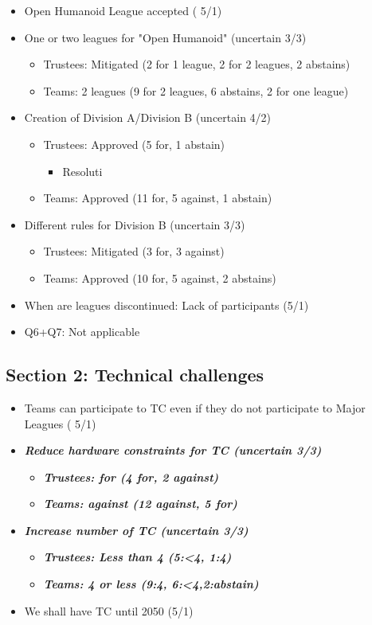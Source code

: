 \documentclass{article}
\begin{document}
\begin{itemize} 
   \item Open Humanoid League accepted ( 5/1)
   \item One or two leagues for "Open Humanoid" (uncertain 3/3)
   \begin{itemize} 
       \item Trustees: Mitigated (2 for 1 league, 2 for 2 leagues, 2 abstains)
       \item Teams: 2 leagues (9 for 2 leagues, 6 abstains, 2 for one league)
\end{itemize}
   \item Creation of Division A/Division B (uncertain 4/2)
   \begin{itemize} 
       \item Trustees: Approved (5 for, 1 abstain)
           \begin{itemize} 
               \item Resoluti
   \end{itemize}
       \item Teams: Approved (11 for, 5 against, 1 abstain)
\end{itemize}
   \item Different rules for Division B (uncertain 3/3)
   \begin{itemize} 
       \item Trustees: Mitigated (3 for, 3 against)
       \item Teams: Approved (10 for, 5 against, 2 abstains)
\end{itemize}
   \item When are leagues discontinued: Lack of participants (5/1)
   \item Q6+Q7: Not applicable
\end{itemize}
\subsection{Section 2: Technical challenges}

\begin{itemize} 
   \item Teams can participate to TC even if they do not participate to Major Leagues ( 5/1)
   \item \textbf{\textit{Reduce hardware constraints for TC (uncertain 3/3)}}
   \begin{itemize} 
       \item \textbf{\textit{Trustees: for (4 for, 2 against)}}
       \item \textbf{\textit{Teams: against (12 against, 5 for)}}
\end{itemize}
   \item \textbf{\textit{Increase number of TC (uncertain 3/3)}}
   \begin{itemize} 
       \item \textbf{\textit{Trustees: Less than 4 (5:<4, 1:4)}}
       \item \textbf{\textit{Teams: 4 or less (9:4, 6:<4,2:abstain)}}
\end{itemize}
   \item We shall have TC until 2050 (5/1)
\end{itemize}
\end{document}
